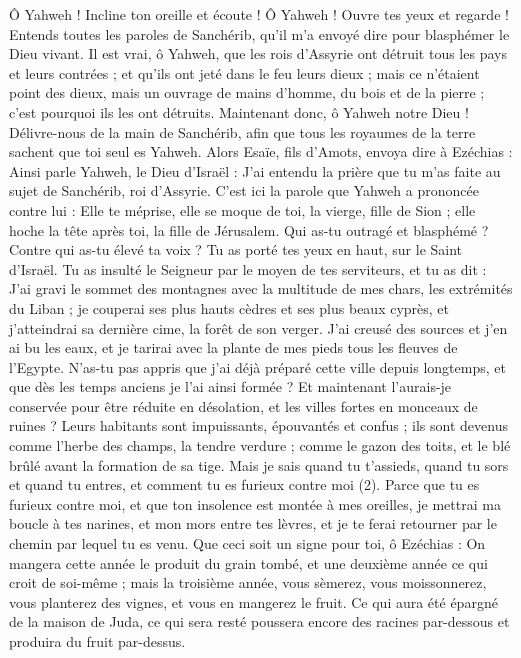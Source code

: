 \begin{multicols}{2}
Ô Yahweh ! Incline ton oreille et écoute ! Ô Yahweh ! Ouvre tes yeux et regarde ! Entends toutes les paroles de Sanchérib, qu’il m'a envoyé dire pour blasphémer le Dieu vivant.
Il est vrai, ô Yahweh, que les rois d’Assyrie ont détruit tous les pays et leurs contrées ;
et qu'ils ont jeté dans le feu leurs dieux ; mais ce n'étaient point des dieux, mais un ouvrage de mains d'homme, du bois et de la pierre ; c'est pourquoi ils les ont détruits.
Maintenant donc, ô Yahweh notre Dieu ! Délivre-nous de la main de Sanchérib, afin que tous les royaumes de la terre sachent que toi seul es Yahweh.
Alors Esaïe, fils d'Amots, envoya dire à Ezéchias : Ainsi parle Yahweh, le Dieu d'Israël : J’ai entendu la prière que tu m’as faite au sujet de Sanchérib, roi d’Assyrie.
C'est ici la parole que Yahweh a prononcée contre lui : Elle te méprise, elle se moque de toi, la vierge, fille de Sion ; elle hoche la tête après toi, la fille de Jérusalem.
Qui as-tu outragé et blasphémé ? Contre qui as-tu élevé ta voix ? Tu as porté tes yeux en haut, sur le Saint d'Israël.
Tu as insulté le Seigneur par le moyen de tes serviteurs, et tu as dit : J’ai gravi le sommet des montagnes avec la multitude de mes chars, les extrémités du Liban ; je couperai ses plus hauts cèdres et ses plus beaux cyprès, et j’atteindrai sa dernière cime, la forêt de son verger.
J'ai creusé des sources et j'en ai bu les eaux, et je tarirai avec la plante de mes pieds tous les fleuves de l’Egypte.
N'as-tu pas appris que j’ai déjà préparé cette ville depuis longtemps, et que dès les temps anciens je l'ai ainsi formée ? Et maintenant l'aurais-je conservée pour être réduite en désolation, et les villes fortes en monceaux de ruines ?
Leurs habitants sont impuissants, épouvantés et confus ; ils sont devenus comme l'herbe des champs, la tendre verdure ; comme le gazon des toits, et le blé brûlé avant la formation de sa tige.
Mais je sais quand tu t’assieds, quand tu sors et quand tu entres, et comment tu es furieux contre moi (2).
Parce que tu es furieux contre moi, et que ton insolence est montée à mes oreilles, je mettrai ma boucle à tes narines, et mon mors entre tes lèvres, et je te ferai retourner par le chemin par lequel tu es venu.
Que ceci soit un signe pour toi, ô Ezéchias : On mangera cette année le produit du grain tombé, et une deuxième année ce qui croit de soi-même ; mais la troisième année, vous sèmerez, vous moissonnerez, vous planterez des vignes, et vous en mangerez le fruit.
Ce qui aura été épargné de la maison de Juda, ce qui sera resté poussera encore des racines par-dessous et produira du fruit par-dessus.

\end{multicols}

